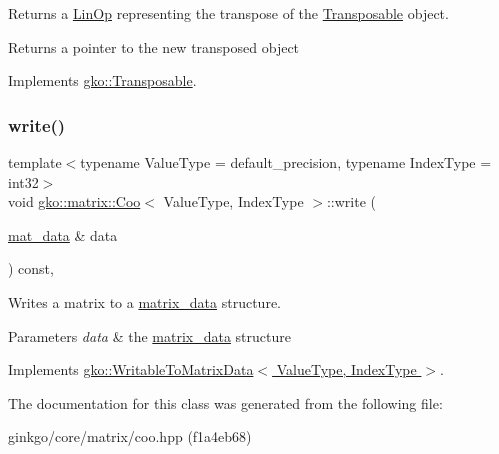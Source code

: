 Returns a \hyperlink{classgko_1_1LinOp}{Lin\+Op} representing the transpose of the \hyperlink{classgko_1_1Transposable}{Transposable} object. 

\begin{DoxyReturn}{Returns}
a pointer to the new transposed object 
\end{DoxyReturn}


Implements \hyperlink{classgko_1_1Transposable_a5c6b778b71b47d53e0bda6ccf894d318}{gko\+::\+Transposable}.

\mbox{\label{classgko_1_1matrix_1_1Coo_ae193466ca1a4a3c7d1383ddc5a2701ab}} 
\subsubsection{\texorpdfstring{write()}{write()}}
{\footnotesize\ttfamily template$<$typename Value\+Type = default\+\_\+precision, typename Index\+Type = int32$>$ \\
void \hyperlink{classgko_1_1matrix_1_1Coo}{gko\+::matrix\+::\+Coo}$<$ Value\+Type, Index\+Type $>$\+::write (\begin{DoxyParamCaption}\item[{\hyperlink{structgko_1_1matrix__data}{mat\+\_\+data} \&}]{data }\end{DoxyParamCaption}) const\hspace{0.3cm}{\ttfamily [override]}, {\ttfamily [virtual]}}



Writes a matrix to a \hyperlink{structgko_1_1matrix__data}{matrix\+\_\+data} structure. 


\begin{DoxyParams}{Parameters}
{\em data} & the \hyperlink{structgko_1_1matrix__data}{matrix\+\_\+data} structure \\
\hline
\end{DoxyParams}


Implements \hyperlink{classgko_1_1WritableToMatrixData_a96036c3a4bf4c67fa93002808b8b14e2}{gko\+::\+Writable\+To\+Matrix\+Data$<$ Value\+Type, Index\+Type $>$}.



The documentation for this class was generated from the following file\+:\begin{DoxyCompactItemize}
\item 
ginkgo/core/matrix/coo.\+hpp (f1a4eb68)\end{DoxyCompactItemize}
